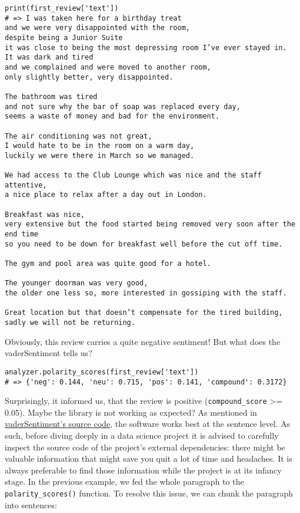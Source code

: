 	\begin{Verbatim}
print(first_review['text'])
# => I was taken here for a birthday treat
and we were very disappointed with the room,
despite being a Junior Suite
it was close to being the most depressing room I’ve ever stayed in.
It was dark and tired
and we complained and were moved to another room,
only slightly better, very disappointed.

The bathroom was tired
and not sure why the bar of soap was replaced every day,
seems a waste of money and bad for the environment.

The air conditioning was not great,
I would hate to be in the room on a warm day,
luckily we were there in March so we managed.

We had access to the Club Lounge which was nice and the staff attentive,
a nice place to relax after a day out in London.

Breakfast was nice,
very extensive but the food started being removed very soon after the end time
so you need to be down for breakfast well before the cut off time.

The gym and pool area was quite good for a hotel.

The younger doorman was very good,
the older one less so, more interested in gossiping with the staff.

Great location but that doesn’t compensate for the tired building,
sadly we will not be returning.
	\end{Verbatim}
	Obviously, this review carries a quite negative sentiment! But what does the vaderSentiment tells us?
	\begin{Verbatim}
analyzer.polarity_scores(first_review['text'])
# => {'neg': 0.144, 'neu': 0.715, 'pos': 0.141, 'compound': 0.3172}
	\end{Verbatim}
	Surprisingly, it informed us, that the review is positive (\verb|compound_score| >= 0.05). Maybe the library is not working as expected? As mentioned in \href{https://github.com/cjhutto/vaderSentiment/blob/master/vaderSentiment/vaderSentiment.py#L600}{vaderSentiment's source code}, the software works best at the sentence level.  As such, before diving deeply in a data science project it is advised to carefully inspect the source code of the project's external dependencies: there might be valuable information that might save you quit a lot of time and headaches. It is always preferable to find those information while the project is at its infancy stage. In the previous example, we fed the whole paragraph to the \verb|polarity_scores()| function. To resolve this issue, we can chunk the paragraph into sentences:
